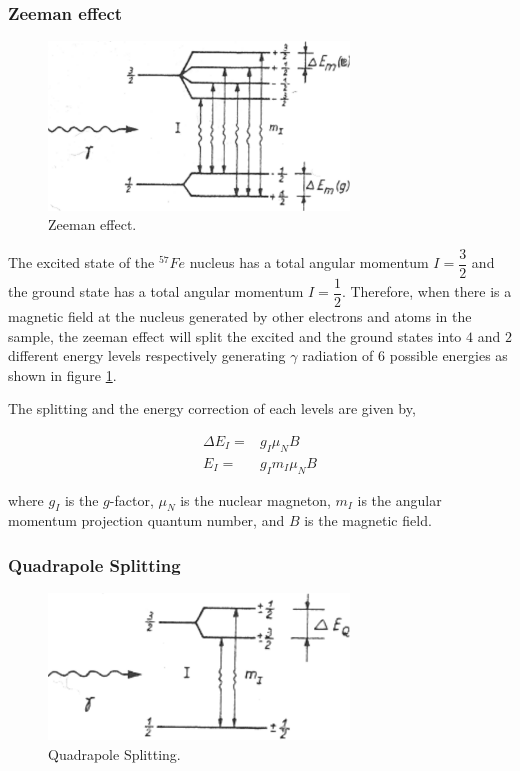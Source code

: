\documentclass[aps,twocolumn,secnumarabic,balancelastpage,amsmath,amssymb,nofootinbib]{revtex4}
\newcommand{\eqar}[1]
{
  \begin{align*}
    #1
  \end{align*}
}
\begin{document}
\subsubsection{Zeeman effect}
\begin{figure}
  \includegraphics[width=8cm]{../share/zeeman.png}
  \caption{Zeeman effect.}
  \label{zeeman}
\end{figure}

The excited state of the ${}^{57}Fe$ nucleus has a total angular momentum $I=\dfrac32$ and the ground state has a total angular momentum $I=\dfrac12$. Therefore, when there is a magnetic field at the nucleus generated by other electrons and atoms in the sample, the zeeman effect will split the excited and the ground states into $4$ and $2$ different energy levels respectively generating $\gamma$ radiation of $6$ possible energies as shown in figure \ref{zeeman}.

The splitting and the energy correction of each levels are given by,
\eqar{
  \Delta E_I=&g_I\mu_NB\\
  E_I=&g_Im_I\mu_NB
}
where $g_I$ is the $g$-factor, $\mu_N$ is the nuclear magneton, $m_I$ is the angular momentum projection quantum number, and $B$ is the magnetic field.

\subsubsection{Quadrapole Splitting}
\begin{figure}
  \includegraphics[width=8cm]{../share/quad.png}
  \caption{Quadrapole Splitting.}
  \label{quad}
\end{figure}
\end{document}
